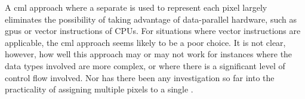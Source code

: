 A \gls{cml} approach where a separate  is used to represent each pixel largely eliminates the possibility of taking advantage of data-parallel hardware, such as \glspl{gpu} or vector instructions of CPUs.  For situations where vector instructions are applicable, the \gls{cml} approach seems likely to be a poor choice.  It is not clear, however, how well this approach may or may not work for instances where the data types involved are more complex, or where there is a significant level of control flow involved.  Nor has there been any investigation so far into the practicality of assigning multiple pixels to a single .